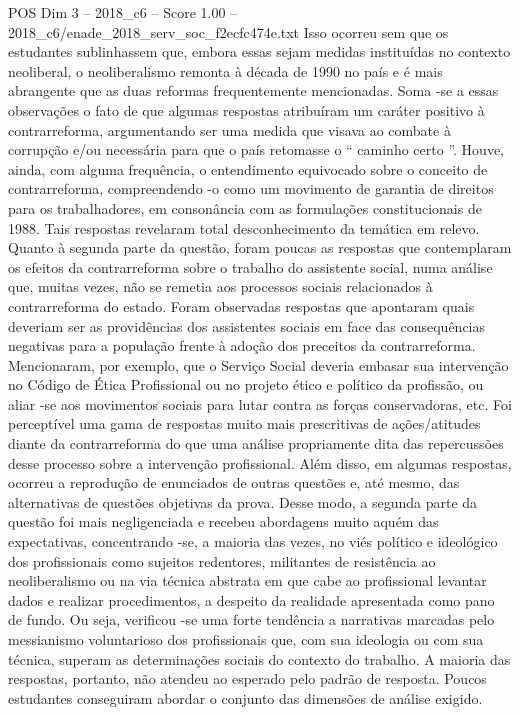 \begin{textsample}{POS Dim 3 – 2018\_c6 – Score 1.00 – 2018\_c6/enade\_2018\_serv\_soc\_f2ecfc474e.txt}
Isso ocorreu sem que os estudantes sublinhassem que, embora essas sejam medidas instituídas no contexto neoliberal, o neoliberalismo remonta à década de 1990 no país e é mais abrangente que as duas reformas frequentemente mencionadas.
Soma -se a essas observações o fato de que algumas respostas atribuíram um caráter positivo à contrarreforma, argumentando ser uma medida que visava ao combate à corrupção e/ou necessária para que o país retomasse o “ caminho certo ”.
Houve, ainda, com alguma frequência, o entendimento equivocado sobre o conceito de contrarreforma, compreendendo -o como um movimento de garantia de direitos para os trabalhadores, em consonância com as formulações constitucionais de 1988.
Tais respostas revelaram total desconhecimento da temática em relevo.
Quanto à segunda parte da questão, foram poucas as respostas que contemplaram os efeitos da contrarreforma sobre o trabalho do assistente social, numa análise que, muitas vezes, não se remetia aos processos sociais relacionados à contrarreforma do estado.
Foram observadas respostas que apontaram quais deveriam ser as providências dos assistentes sociais em face das consequências negativas para a população frente à adoção dos preceitos da contrarreforma.
Mencionaram, por exemplo, que o Serviço Social deveria embasar sua intervenção no Código de Ética Profissional ou no projeto ético e político da profissão, ou aliar -se aos movimentos sociais para lutar contra as forças conservadoras, etc.
Foi perceptível uma gama de respostas muito mais prescritivas de ações/atitudes diante da contrarreforma do que uma análise propriamente dita das repercussões desse processo sobre a intervenção profissional.
Além disso, em algumas respostas, ocorreu a reprodução de enunciados de outras questões e, até mesmo, das alternativas de questões objetivas da prova.
Desse modo, a segunda parte da questão foi mais negligenciada e recebeu abordagens muito aquém das expectativas, concentrando -se, a maioria das vezes, no viés político e ideológico dos profissionais como sujeitos redentores, militantes de resistência ao neoliberalismo ou na via técnica abstrata em que cabe ao profissional levantar dados e realizar procedimentos, a despeito da realidade apresentada como pano de fundo.
Ou seja, verificou -se uma forte tendência a narrativas marcadas pelo messianismo voluntarioso dos profissionais que, com sua ideologia ou com sua técnica, superam as determinações sociais do contexto do trabalho.
A maioria das respostas, portanto, não atendeu ao esperado pelo padrão de resposta.
Poucos estudantes conseguiram abordar o conjunto das dimensões de análise exigido.

\end{textsample}
